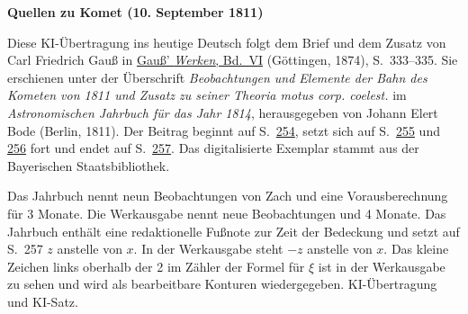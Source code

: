 \clearpage\thispagestyle{empty}
\begin{center}\textbf{Quellen zu Komet (10. September 1811)}\end{center}
\noindent Diese KI-Übertragung ins heutige Deutsch folgt dem Brief und dem Zusatz von Carl Friedrich Gauß in \href{https://gdz.sub.uni-goettingen.de/id/PPN236007467}{Gauß’ \textit{Werken}, Bd.~VI} (Göttingen, 1874), S.~333--335. Sie erschienen unter der Überschrift \textit{Beobachtungen und Elemente der Bahn des Kometen von 1811 und Zusatz zu seiner Theoria motus corp. coelest.} im \textit{Astronomischen Jahrbuch für das Jahr 1814}, herausgegeben von Johann Elert Bode (Berlin, 1811). Der Beitrag beginnt auf S.~\href{https://api.digitale-sammlungen.de/iiif/image/v2/bsb10538343_00262/full/1600,/0/default.jpg}{254}, setzt sich auf S.~\href{https://api.digitale-sammlungen.de/iiif/image/v2/bsb10538343_00263/full/1600,/0/default.jpg}{255} und \href{https://api.digitale-sammlungen.de/iiif/image/v2/bsb10538343_00264/full/1600,/0/default.jpg}{256} fort und endet auf S.~\href{https://api.digitale-sammlungen.de/iiif/image/v2/bsb10538343_00265/full/1600,/0/default.jpg}{257}. Das digitalisierte Exemplar stammt aus der Bayerischen Staatsbibliothek.
\par\smallskip\noindent Das Jahrbuch nennt neun Beobachtungen von Zach und eine Vorausberechnung für 3 Monate. Die Werkausgabe nennt neue Beobachtungen und 4 Monate. Das Jahrbuch enthält eine redaktionelle Fußnote zur Zeit der Bedeckung und setzt auf S.~257 $z$ anstelle von $x$. In der Werkausgabe steht $-z$ anstelle von $x$. Das kleine Zeichen links oberhalb der 2 im Zähler der Formel für $\xi$ ist in der Werkausgabe zu sehen und wird als bearbeitbare Konturen wiedergegeben. KI-Übertragung und KI-Satz.
\clearpage
